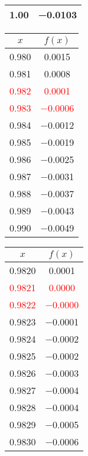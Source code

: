 \documentclass{article}
\begin{document}
\begin{enumerate}
\begin{enumerate}
\begin{tabular}{|c|c|}
            \num{1,00} & \num{-0,0103} \\
            \hline
            \end{tabular}\quad
            \begin{tabular}{|c|c|}
            \hline
            $x$   & $f(x)$ \\
            \hline
            \num{0,980} & \num{0,0015} \\
            \num{0,981} & \num{0,0008} \\
            \textcolor{red}{\num{0,982}} & \textcolor{red}{\num{0,0001}} \\
            \textcolor{red}{\num{0,983}} & \textcolor{red}{\num{-0,0006}} \\
            \num{0,984} & \num{-0,0012} \\
            \num{0,985} & \num{-0,0019} \\
            \num{0,986} & \num{-0,0025} \\
            \num{0,987} & \num{-0,0031} \\
            \num{0,988} & \num{-0,0037} \\
            \num{0,989} & \num{-0,0043} \\
            \num{0,990} & \num{-0,0049} \\
            \hline
            \end{tabular}\quad
            \begin{tabular}{|c|c|}
            \hline
            $x$   & $f(x)$ \\
            \hline
            \num{0,9820} & \num{0,0001} \\
            \textcolor{red}{\num{0,9821}} & \textcolor{red}{\num{0,0000}} \\
            \textcolor{red}{\num{0,9822}} & \textcolor{red}{\num{-0,0000}} \\
            \num{0,9823} & \num{-0,0001} \\
            \num{0,9824} & \num{-0,0002} \\
            \num{0,9825} & \num{-0,0002} \\
            \num{0,9826} & \num{-0,0003} \\
            \num{0,9827} & \num{-0,0004} \\
            \num{0,9828} & \num{-0,0004} \\
            \num{0,9829} & \num{-0,0005} \\
            \num{0,9830} & \num{-0,0006} \\
            \hline
            \end{tabular}\quad \\
            

\end{enumerate}
\end{enumerate}
\end{document}
